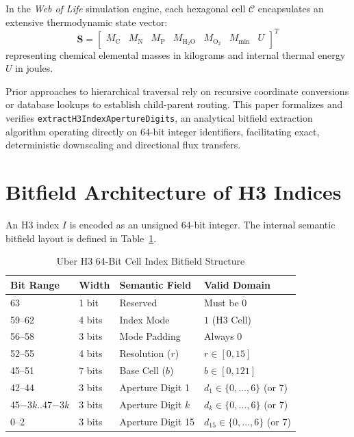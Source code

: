 \documentclass[10pt,journal,compsoc]{IEEEtran}
\begin{document}
In the \textit{Web of Life} simulation engine, each hexagonal cell $\mathcal{C}$ encapsulates an extensive thermodynamic state vector:
\begin{equation}
\mathbf{S} = \begin{bmatrix} M_{\text{C}} & M_{\text{N}} & M_{\text{P}} & M_{\text{H}_2\text{O}} & M_{\text{O}_2} & M_{\text{min}} & U \end{bmatrix}^T
\end{equation}
representing chemical elemental masses in kilograms and internal thermal energy $U$ in joules.

Prior approaches to hierarchical traversal rely on recursive coordinate conversions or database lookups to establish child-parent routing. This paper formalizes and verifies \texttt{extractH3IndexApertureDigits}, an analytical bitfield extraction algorithm operating directly on 64-bit integer identifiers, facilitating exact, deterministic downscaling and directional flux transfers.

\section{Bitfield Architecture of H3 Indices}

An H3 index $I$ is encoded as an unsigned 64-bit integer. The internal semantic bitfield layout is defined in Table~\ref{tab:h3_bitfield}.

\begin{table}[htbp]
\caption{Uber H3 64-Bit Cell Index Bitfield Structure}
\label{tab:h3_bitfield}
\centering
\begin{tabular}{@{}llll@{}}
\toprule
\textbf{Bit Range} & \textbf{Width} & \textbf{Semantic Field} & \textbf{Valid Domain} \\
\midrule
63 & 1 bit & Reserved & Must be 0 \\
59--62 & 4 bits & Index Mode & $1$ (H3 Cell) \\
56--58 & 3 bits & Mode Padding & Always 0 \\
52--55 & 4 bits & Resolution ($r$) & $r \in [0, 15]$ \\
45--51 & 7 bits & Base Cell ($b$) & $b \in [0, 121]$ \\
42--44 & 3 bits & Aperture Digit 1 & $d_1 \in \{0,\dots,6\}$ (or 7) \\
45$-3k$..47$-3k$ & 3 bits & Aperture Digit $k$ & $d_k \in \{0,\dots,6\}$ (or 7) \\
0--2 & 3 bits & Aperture Digit 15 & $d_{15} \in \{0,\dots,6\}$ (or 7) \\
\bottomrule
\end{tabular}
\end{table}
\end{document}
